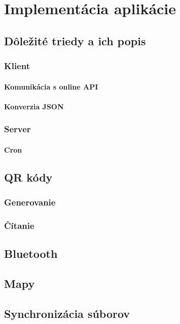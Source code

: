 \chapter{Implementácia aplikácie}


\section{Dôležité triedy a ich popis}
\subsection{Klient}
\subsubsection{Komunikácia s online API}
\subsubsection{Konverzia JSON}
\subsection{Server}
\subsubsection{Cron}



\section{QR kódy}
\subsection{Generovanie}
\subsection{Čítanie}


\section{Bluetooth}


\section{Mapy}

\section{Synchronizácia súborov}

